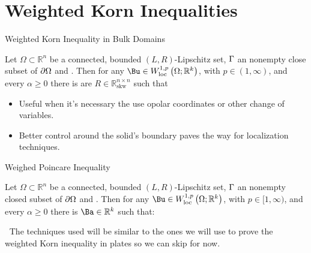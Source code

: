 \documentclass{beamer}
\newcommand{\bul}{{\color{structure}\textbullet}}
\begin{document}
\section{Weighted Korn Inequalities}
\begin{frame}{Weighted Korn Inequality in Bulk Domains}
    \begin{theorem} \label{KornGamma} Let $\Omega \subset \mathbb{R}^n$ be a connected, bounded $(L, R)$-Lipschitz set,  $\Gamma$ an nonempty  close subset of $\partial\Omega$ and \vl{$\delta_\GG(\Bx)=\dist(\Bx, \partial\GG)$}. Then for any $\Bu \in W_{\mathrm{loc}}^{1, p}\left(\Omega ; \mathbb{R}^k\right)$, with $p \in(1, \infty)$, and every $\alpha\geq0$ there is are  $R \in \mathbb{R}_{\mathrm{skw}}^{n \times n}$ such that
    \end{theorem}
\pause
    \begin{itemize}
        \item[\bul] Useful when it's necessary the use opolar coordinates or other change of variables.
        \pause\vfill
        \item[\bul] Better control around the solid's boundary paves the way for localization techniques.
    \end{itemize}
    
\end{frame}
\begin{frame}{Weighed Poincare Inequality}
    \begin{theorem} \label{WeightedPoincareOld} Let $\Omega \subset \mathbb{R}^n$ be a connected, bounded $(L, R)$-Lipschitz set,  $\Gamma$ an nonempty closed subset of $\partial\Omega$  and \vl{$\delta_\GG(\Bx)=\dist(\Bx, \partial\GG)$}. Then for any $\Bu \in W_{\mathrm{loc}}^{1, p}\left(\Omega ; \mathbb{R}^k\right)$, with $p \in[1, \infty)$, and every $\alpha\geq 0$ there is $\Ba \in \mathbb{R}^k$ such that:
    \end{theorem}
    \vfill
    \bul$\ $ The techniques used will be similar to the ones we will use to prove the weighted Korn inequality in plates so we can skip for now.
\end{frame}
\end{document}
